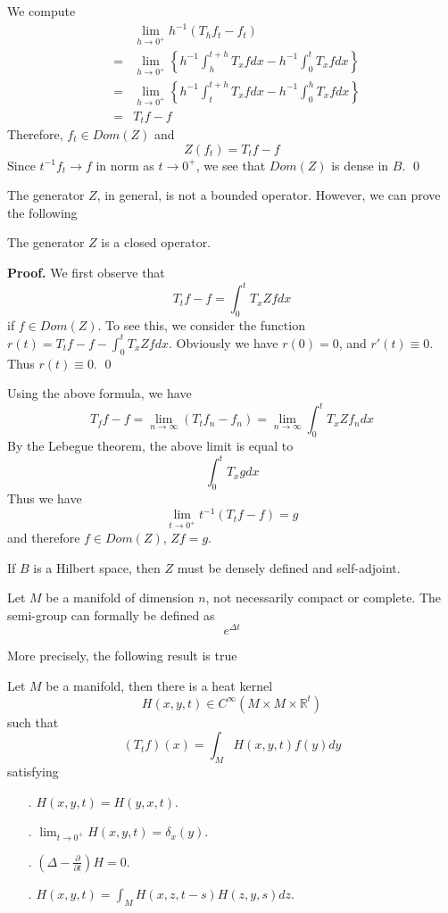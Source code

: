 We compute
\begin{eqnarray}
\nonumber & & \lim_{h\rightarrow 0^+} h^{-1} (T_h f_t - f_t) \\
\nonumber & = & \lim_{h\rightarrow 0^+}\left\{h^{-1}\int_h^{t+h} T_x fdx - h^{-1}\int_0^t T_xfdx\right\} \\
\nonumber & = & \lim_{h\rightarrow 0^+}\left\{h^{-1}\int_t^{t+h} T_x fdx - h^{-1}\int_0^h T_xfdx\right\} \\
\nonumber & = & T_t f - f
\end{eqnarray}
Therefore, $f_t \in Dom(Z)$ and
\[
Z(f_t) = T_t f - f
\]
Since $t^{-1}f_t \rightarrow f$ in norm as $t\rightarrow 0^+$, we see that
$Dom(Z)$ is dense in $B$.
\qed

The generator $Z$, in general, is not a bounded operator. However, we can prove
the following
\begin{lemma}
The generator $Z$ is a closed operator.
\end{lemma}
{\bf Proof.}
We first observe that
\[
T_t f - f = \int_0^t T_x Z f dx
\]
if $f\in Dom(Z)$. To see this, we consider the function 
$r(t) = T_t f - f - \int_0^t T_x Zfdx$. Obviously we have $r(0) = 0$, and
$r'(t)\equiv 0$. Thus $r(t)\equiv 0$.
\qed

Using the above formula, we have
\[
T_f f - f = \lim_{n\rightarrow\infty}(T_t f_n - f_n) = \lim_{n\rightarrow\infty}
\int_0^t T_x Z f_n dx
\]
By the Lebegue theorem, the above limit is equal to
\[
\int_0^t T_x g dx
\]
Thus we have
\[
\lim_{t\rightarrow 0^+}t^{-1}(T_t f - f) = g
\]
and therefore $f\in Dom(Z)$, $Zf = g$.
\\

\begin{lemma}
If $B$ is a Hilbert space, then $Z$ must be densely defined and self-adjoint.
\end{lemma}

Let $M$ be a manifold of dimension $n$, not necessarily compact or complete. The
semi-group can formally be defined as
\[
e^{\Delta t}
\]

More precisely, the following result is true
\begin{theorem}
Let $M$ be a manifold, then there is a heat kernel
\[
H(x,y,t) \in C^{\infty}(M\times M\times \mathbb{R}^t)
\]
such that
\[
(T_t f)(x) = \int_M H(x,y,t)f(y)dy
\]
satisfying
\begin{itemize}
\item[\ding{172}.] $H(x,y,t) = H(y,x,t)$.
\item[\ding{173}.] $\lim_{t\rightarrow 0^+} H(x,y,t) = \delta_x(y)$.
\item[\ding{174}.] $(\Delta - \frac{\partial}{\partial t})H = 0$.
\item[\ding{175}.] $H(x,y,t) = \int_M H(x,z,t-s)H(z,y,s)dz$.
\end{itemize}
\end{theorem}

